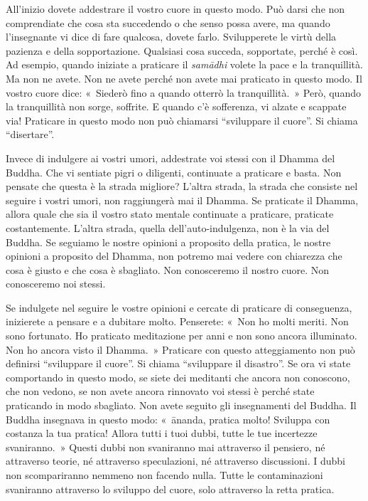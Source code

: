 All'inizio dovete addestrare il vostro cuore in questo modo. Può darsi
che non comprendiate che cosa sta succedendo o che senso possa avere, ma
quando l'insegnante vi dice di fare qualcosa, dovete farlo. Svilupperete
le virtù della pazienza e della sopportazione. Qualsiasi cosa succeda,
sopportate, perché è così. Ad esempio, quando iniziate a praticare il
\emph{samādhi} volete la pace e la tranquillità. Ma non ne avete. Non ne
avete perché non avete mai praticato in questo modo. Il vostro cuore
dice: «~Siederò fino a quando otterrò la tranquillità.~» Però, quando la
tranquillità non sorge, soffrite. E quando c'è sofferenza, vi alzate e
scappate via! Praticare in questo modo non può chiamarsi ``sviluppare il
cuore''. Si chiama ``disertare''.

Invece di indulgere ai vostri umori, addestrate voi stessi con il Dhamma
del Buddha. Che vi sentiate pigri o diligenti, continuate a praticare e
basta. Non pensate che questa è la strada migliore? L'altra strada, la
strada che consiste nel seguire i vostri umori, non raggiungerà mai il
Dhamma. Se praticate il Dhamma, allora quale che sia il vostro stato
mentale continuate a praticare, praticate costantemente. L'altra strada,
quella dell'auto-indulgenza, non è la via del Buddha. Se seguiamo le
nostre opinioni a proposito della pratica, le nostre opinioni a
proposito del Dhamma, non potremo mai vedere con chiarezza che cosa è
giusto e che cosa è sbagliato. Non conosceremo il nostro cuore. Non
conosceremo noi stessi.

Se indulgete nel seguire le vostre opinioni e cercate di praticare di
conseguenza, inizierete a pensare e a dubitare molto. Penserete: «~Non
ho molti meriti. Non sono fortunato. Ho praticato meditazione per anni e
non sono ancora illuminato. Non ho ancora visto il Dhamma.~» Praticare
con questo atteggiamento non può definirsi ``sviluppare il cuore''. Si
chiama ``sviluppare il disastro''. Se ora vi state comportando in questo
modo, se siete dei meditanti che ancora non conoscono, che non vedono,
se non avete ancora rinnovato voi stessi è perché state praticando in
modo sbagliato. Non avete seguito gli insegnamenti del Buddha. Il Buddha
insegnava in questo modo: «~ānanda, pratica molto! Sviluppa con costanza
la tua pratica! Allora tutti i tuoi dubbi, tutte le tue incertezze
svaniranno.~» Questi dubbi non svaniranno mai attraverso il pensiero, né
attraverso teorie, né attraverso speculazioni, né attraverso
discussioni. I dubbi non scompariranno nemmeno non facendo nulla. Tutte
le contaminazioni svaniranno attraverso lo sviluppo del cuore, solo
attraverso la retta pratica.

